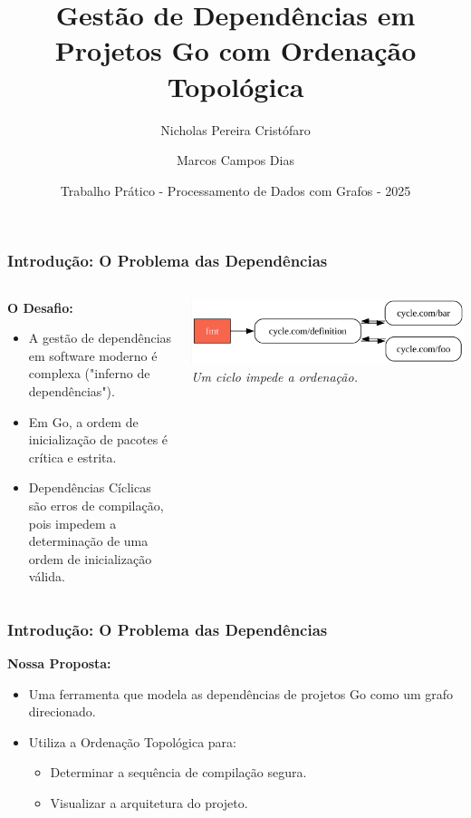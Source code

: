 \documentclass{beamer}
\title[Análise de Dependências Go]{Gestão de Dependências em Projetos Go com Ordenação Topológica}
\author{Nicholas Pereira Cristófaro \and Marcos Campos Dias}
\institute{Pontifícia Universidade Católica de Minas Gerais (PUC Minas)}
\date{Trabalho Prático - Processamento de Dados com Grafos - 2025}
\begin{document}
\begin{frame}
  \titlepage
\end{frame}

\begin{frame}
  \frametitle{Introdução: O Problema das Dependências}

  \begin{columns}[T] %
    \begin{column}{0.6\textwidth}
      \textbf{O Desafio:}
      \begin{itemize}
        \item A gestão de dependências em software moderno é complexa ("inferno de dependências").
        \item Em Go, a ordem de inicialização de pacotes é crítica e estrita.
        \item \alert{Dependências Cíclicas} são erros de compilação, pois impedem a determinação de uma ordem de inicialização válida.
      \end{itemize}
    \end{column}
    \begin{column}{0.4\textwidth}
        \centering
        \includegraphics[width=\textwidth]{images/cycle.png}
        \tiny
        \textit{Um ciclo impede a ordenação.}
    \end{column}
  \end{columns}
\end{frame}

\begin{frame}
  \frametitle{Introdução: O Problema das Dependências}
      \textbf{Nossa Proposta:}
      \begin{itemize}
        \item Uma ferramenta que modela as dependências de projetos Go como um grafo direcionado.
        \item Utiliza a \alert{Ordenação Topológica} para:
        \begin{itemize}
          \item Determinar a sequência de compilação segura.
          \item Visualizar a arquitetura do projeto.
        \end{itemize}
      \end{itemize}
\end{frame}
\end{document}
